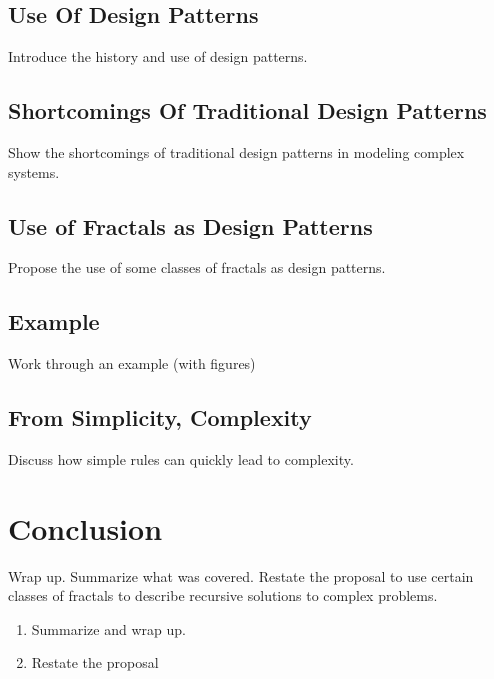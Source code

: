 \documentclass[jou,apacite]{apa6}
\begin{document}
\subsection{Use Of Design Patterns}
Introduce the history and use of design patterns.~\cite{Gamma}

\subsection{Shortcomings Of Traditional Design Patterns}
Show the shortcomings of traditional design patterns in modeling complex systems.

\subsection{Use of Fractals as Design Patterns}
Propose the use of some classes of fractals as design patterns.

\subsection{Example}
Work through an example (with figures)

\subsection{From Simplicity, Complexity}
Discuss how simple rules can quickly lead to complexity.

\section{Conclusion}  %
Wrap up.  Summarize what was covered.  Restate the proposal to use certain classes of fractals to describe recursive solutions to complex problems.
\begin{enumerate}
  \item Summarize and wrap up.
  \item Restate the proposal
\end{enumerate}


\end{document}
